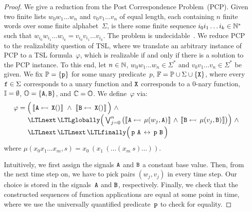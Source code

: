 \begin{proof}
  We give a reduction from the Post Correspondence Problem~(PCP).
  Given two finite lists $ w_{0}w_{1}\ldots w_{n} $ and
  $ v_{0}v_{1}\ldots v_{n} $ of equal length, each containing $ n $ finite
  words over some finite alphabet~$ \Sigma $, is there some finite
  sequence $ i_{0}i_{1}\ldots i_{k} \in \mathbb{N}^{*} $ such that
  $ w_{i_{0}}w_{i_{1}}\ldots w_{i_{k}} = v_{i_{0}} v_{i_{1}} \ldots
  v_{i_{k}} $. The problem is undecidable~\cite{post1946}.
  We reduce PCP to the realizability question of TSL, where we
  translate an arbitrary instance of PCP to a TSL formula~$ \varphi $,
  which is realizable if and only if there is a solution to the PCP
  instance. To this end, let $ n \in \mathbb{N} $,
  $ w_{0}w_{1}\ldots w_{n} \in \Sigma^{*} $ and
  $ v_{0}v_{1}\ldots v_{n} \in \Sigma^{*} $ be given.  We fix
  $ \mathbb{P} = \{  {\text{\texttt{p}}}  \} $ for some unary predicate~$ p $,
  \mbox{$ \mathbb{F} = \mathbb{P} \cup \Sigma \cup \{  {\text{\texttt{X}}}  \} $}, where every
  $ {\text{\texttt{f}}} \in \Sigma $ corresponds to a unary function and
  $ {\text{\texttt{X}}} $ corresponds to a $ 0 $-nary function,
  $ \mathbb{I} = \emptyset $, $ \mathbb{O} = \{  {\text{\texttt{A}}}, {\text{\texttt{B}}}  \} $, and
  $ \mathbb{C} = \mathbb{O} $. We define~$ \varphi $ via:
  \begin{equation*}
    \begin{array}{l}
    \varphi =  \Big( \, \upd{\name{A}}{\const{X}} \ \wedge \ \upd{\name{B}}{\const{X}} \, \Big)
    \ \wedge \\[0.2em] \phantom{\varphi \ =} \LTLnext\, \LTLglobally
    \Big( \bigvee_{j=0}^{n} \big( \upd{\name{A}}{\mu(w_{j},\name{A})} \, \wedge \,
    \upd{\name{B}}{\mu(v_{j},\name{B})} \big) \Big) \ \wedge  \\[0.2em]
      \phantom{\varphi \ =} \LTLnext \, \LTLnext \, \LTLfinally \Big( \, \name{p}~\name{A}
    \, \leftrightarrow \, \name{p}~\name{B} \, \Big)
    \end{array}
  \end{equation*}
  where
  $ \mu(x_{0}x_{1}\ldots x_{m},s) = x_{0}~(x_{1}~(\ldots (x_{m}~s) \ldots
  )) $.

  Intuitively, we first assign the signals $ {\text{\texttt{A}}} $ and
  $ {\text{\texttt{B}}} $ a constant base value. Then, from the next time step
  on, we have to pick pairs $ (w_{j},v_{j}) $ in every time step. Our
  choice is stored in the signals~$ {\text{\texttt{A}}} $ and $ {\text{\texttt{B}}} $,
  respectively. Finally, we check that the constructed sequences of
  function applications are equal at some point in time, where we use the
  universally quantified predicate~$ {\text{\texttt{p}}} $ to check for equality.


\end{proof}
